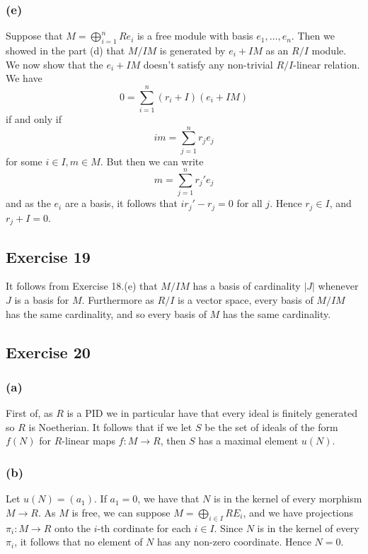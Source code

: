 \documentclass{article}
\theoremstyle{definition}
\begin{document}
\subsubsection*{(e)}

Suppose that $M = \bigoplus_{i = 1}^{n} Re_i$ is a free module with basis $e_1,
\ldots, e_n$. Then we showed in the part (d) that $M/IM$ is generated by $e_i +
IM$ as an $R/I$ module. We now show that the $e_i + IM$ doesn't satisfy any
non-trivial $R/I$-linear relation. We have
\[
	0
	=
	\sum_{i = 1}^{n} (r_i + I)(e_i + IM)
\] 
if and only if 
\[
	im
	=
	\sum_{j = 1}^{n} r_j e_j
\]
for some $i \in I, m \in M$. But then we can write 
\[
	m = \sum_{j = 1}^{n} r_j' e_j
\] 
and as the $e_i$ are a basis, it follows that $i r_j' - r_j = 0$ for all $j$.
Hence $r_j \in I$, and $r_j + I = 0$.

\subsection*{Exercise 19}

It follows from Exercise 18.(e) that $M/IM$ has a basis of cardinality $|J|$
whenever $J$ is a basis for $M$. Furthermore as $R/I$ is a vector space, every
basis of $M/IM$ has the same cardinality, and so every basis of $M$ has the
same cardinality.

\subsection*{Exercise 20}

\subsubsection*{(a)}

First of, as $R$ is a PID we in particular have that every ideal is finitely
generated so $R$ is Noetherian. It follows that if we let $S$ be the set of
ideals of the form $f(N)$ for $R$-linear maps $f : M \to R$, then $S$ has a
maximal element $u(N)$.

\subsubsection*{(b)}

Let $u(N) = (a_1)$. If $a_1 = 0$, we have that $N$ is in the kernel of every
morphism $M \to R$. As $M$ is free, we can suppose $M = \bigoplus_{i \in I} R
E_i$, and we have projections $\pi_i : M \to R$ onto the $i$-th cordinate for
each $i \in I$. Since $N$ is in the kernel of every $\pi_i$, it follows that no
element of $N$ has any non-zero coordinate. Hence $N = 0$.
\end{document}

